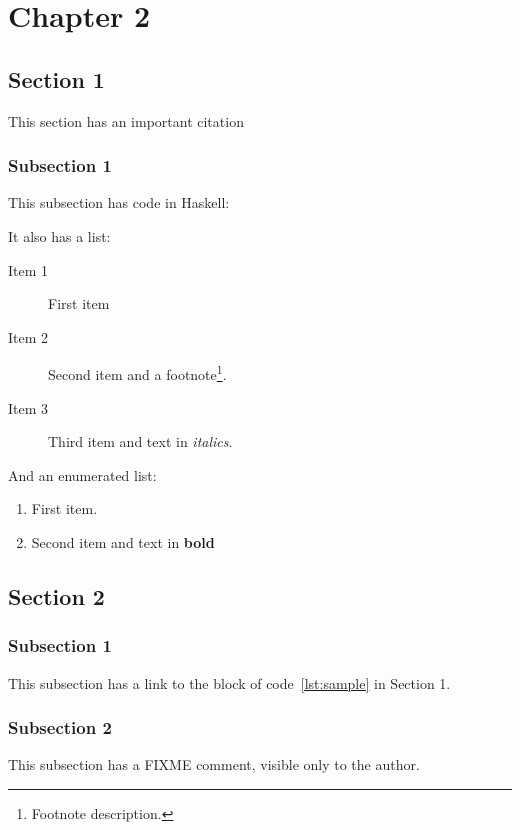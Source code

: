 \chapter{Chapter 2}\label{ch:ch2}

\section{Section 1}

This section has an important citation\cite{inproceeding}

\subsection{Subsection 1}

This subsection has code in Haskell:

It also has a list:
\begin{description}
\item[Item 1]
	First item
\item[Item 2]
	Second item and a footnote\footnote[1]
	{Footnote description.}.
\item[Item 3]
	Third item and text in \textit{italics}.
\end{description}

And an enumerated list:

\begin{enumerate}
\item	First item.
\item	Second item and text in \textbf{bold}
\end{enumerate}

\section{Section 2}

\subsection{Subsection 1}
This subsection has a link to the block of code~\ref{lst:sample} in Section 1.

\subsection{Subsection 2}

This subsection has a FIXME comment, visible only to the author.
